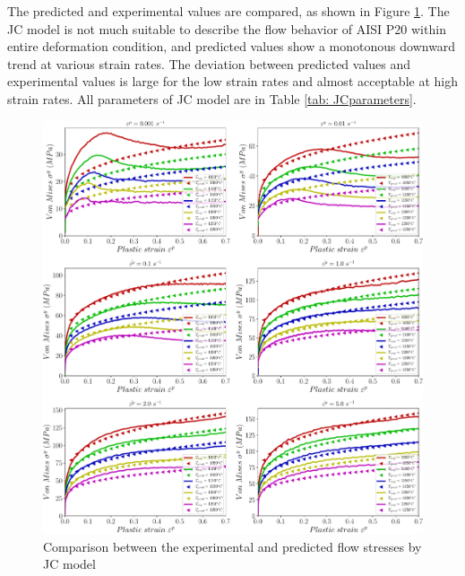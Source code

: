 \documentclass[twoside,english,1p,final,sort&compress]{elsarticle}
\theoremstyle{plain}
\begin{document}
The predicted and experimental values are compared, as shown in Figure \ref{fig:iCorrelationJC}. The JC model is not much suitable to describe the ﬂow behavior of AISI P20 within entire deformation condition, and predicted values show a monotonous downward trend at various strain rates. The deviation between predicted values and experimental values is large for the low strain rates and almost acceptable at high strain rates. All parameters of JC model are in Table \ref{tab: JCparameters}.
\begin{figure}[!ht]
\centering
\includegraphics[width=1.02\columnwidth]
{newFigures/CompExpJC}
\caption{Comparison between the experimental and predicted flow stresses by JC model} 
\label{fig:iCorrelationJC}
\end{figure}
\begin{table}[h!]
\centering{}
\caption{Parameters' constants of Johnson-Cook Model}
\end{table}
\end{document}
